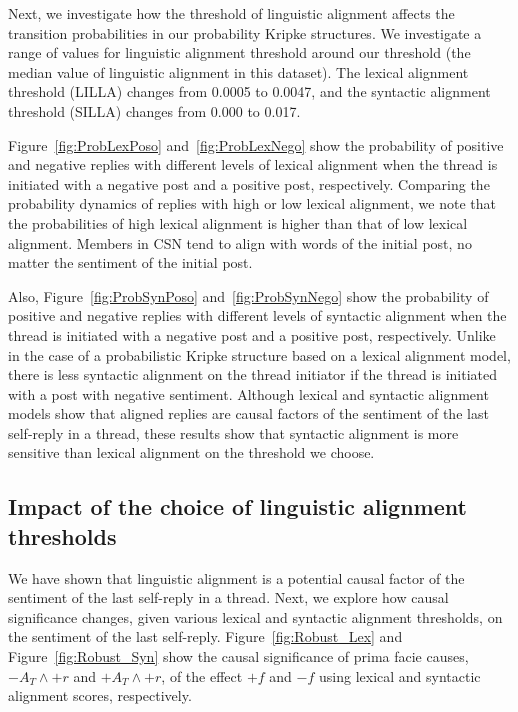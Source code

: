 \documentclass[man,biblatex,floatsintext]{apa6}
\begin{document}
Next, we investigate how the threshold of linguistic alignment affects the transition probabilities in our probability Kripke structures. We investigate a range of values for linguistic alignment threshold around our threshold (the median value of linguistic alignment in this dataset). The lexical alignment threshold (LILLA) changes from 0.0005 to 0.0047, and the syntactic alignment threshold (SILLA) changes from 0.000 to 0.017.


Figure~\ref{fig:ProbLexPoso} and~\ref{fig:ProbLexNego} show the probability of positive and negative replies with different levels of lexical alignment when the thread is initiated with a negative post and a positive post, respectively. Comparing the probability dynamics of replies with high or low lexical alignment, we note that the probabilities of high lexical alignment is higher than that of low lexical alignment. Members in CSN tend to align with words of the initial post, no matter the sentiment of the initial post.

Also, Figure~\ref{fig:ProbSynPoso} and~\ref{fig:ProbSynNego} show the probability of positive and negative replies with different levels of syntactic alignment when the thread is initiated with a negative post and a positive post, respectively. Unlike in the case of a probabilistic Kripke structure based on a lexical alignment model, there is less syntactic alignment on the thread initiator if the thread is initiated with a post with negative sentiment. Although lexical and syntactic alignment models show that aligned replies are causal factors of the sentiment of the last self-reply in a thread, these results show that syntactic alignment is more sensitive than lexical alignment on the threshold we choose.




\subsection{Impact of the choice of linguistic alignment thresholds}

We have shown that linguistic alignment is a potential causal factor of the sentiment of the last self-reply in a thread. Next, we explore how causal significance changes, given various lexical and syntactic alignment thresholds, on the sentiment of the last self-reply. Figure~\ref{fig:Robust_Lex} and Figure~\ref{fig:Robust_Syn} show the causal significance of prima facie causes, $-A_T \wedge +r$ and $+A_T \wedge +r$, of the effect $+f$ and $-f$ using lexical and syntactic alignment scores, respectively.
\end{document}
